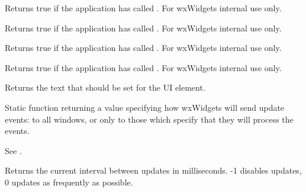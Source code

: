 \label{wxupdateuieventgetsetchecked}


Returns true if the application has called . For wxWidgets internal use only.

\label{wxupdateuieventgetsetenabled}


Returns true if the application has called . For wxWidgets internal use only.

\label{wxupdateuieventgetsetshown}


Returns true if the application has called . For wxWidgets internal use only.

\label{wxupdateuieventgetsettext}


Returns true if the application has called . For wxWidgets internal use only.

\label{wxupdateuieventgettext}


Returns the text that should be set for the UI element.

\label{wxupdateuieventgetmode}


Static function returning a value specifying how wxWidgets
will send update events: to all windows, or only to those which specify that they
will process the events.

See .

\label{wxupdateuieventgetupdateinterval}


Returns the current interval between updates in milliseconds.
-1 disables updates, 0 updates as frequently as possible.

